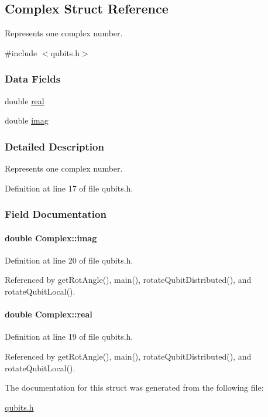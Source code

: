 \hypertarget{structComplex}{
\subsection{Complex Struct Reference}
\label{structComplex}
}


Represents one complex number.  


{\ttfamily \#include $<$qubits.h$>$}\subsubsection*{Data Fields}
\begin{DoxyCompactItemize}
\item 
double \hyperlink{structComplex_a0138f5fe2b2c6180b8fcda77a7aa51c5}{real}
\item 
double \hyperlink{structComplex_a2bb90cc563599c3c8bdec9acf9ea40a6}{imag}
\end{DoxyCompactItemize}


\subsubsection{Detailed Description}
Represents one complex number. 

Definition at line 17 of file qubits.h.

\subsubsection{Field Documentation}
\hypertarget{structComplex_a2bb90cc563599c3c8bdec9acf9ea40a6}{
\paragraph[{imag}]{\setlength{\rightskip}{0pt plus 5cm}double {\bf Complex::imag}}\hfill}
\label{structComplex_a2bb90cc563599c3c8bdec9acf9ea40a6}


Definition at line 20 of file qubits.h.

Referenced by getRotAngle(), main(), rotateQubitDistributed(), and rotateQubitLocal().\hypertarget{structComplex_a0138f5fe2b2c6180b8fcda77a7aa51c5}{
\paragraph[{real}]{\setlength{\rightskip}{0pt plus 5cm}double {\bf Complex::real}}\hfill}
\label{structComplex_a0138f5fe2b2c6180b8fcda77a7aa51c5}


Definition at line 19 of file qubits.h.

Referenced by getRotAngle(), main(), rotateQubitDistributed(), and rotateQubitLocal().

The documentation for this struct was generated from the following file:\begin{DoxyCompactItemize}
\item 
\hyperlink{qubits_8h}{qubits.h}\end{DoxyCompactItemize}
